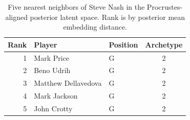\begin{table}[htbp]
  \centering\small
  \begin{tabular}{rllc}
    \toprule
    Rank & Player & Position & Archetype \\
    \midrule
    1 & Mark Price & G & 2 \\
    2 & Beno Udrih & G & 2 \\
    3 & Matthew Dellavedova & G & 2 \\
    4 & Mark Jackson & G & 2 \\
    5 & John Crotty & G & 2 \\
    \bottomrule
  \end{tabular}
  \caption{Five nearest neighbors of Steve Nash in the Procrustes-aligned posterior latent space. Rank is by posterior mean embedding distance.}
  \label{tab:Steve_Nash_neighbors}
\end{table}


